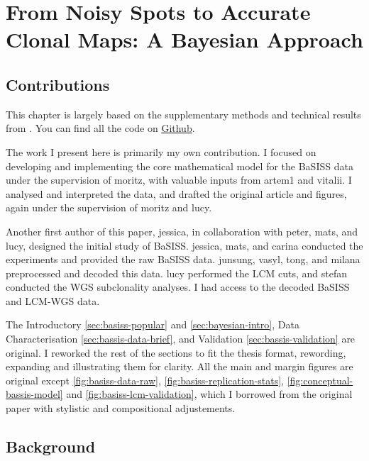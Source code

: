 \chapter{From Noisy Spots to Accurate Clonal Maps: A Bayesian Approach}
\label{sec:chapter-basiss-model}

\section*{Contributions}
This chapter is largely based on the supplementary methods and technical results from . You can find all the code on \href{https://github.com/gerstung-lab/BaSISS}{Github}.

The work I present here is primarily my own contribution. I focused on developing and implementing the core mathematical model for the \acs{BaSISS} data under the supervision of \ac{moritz}, with valuable inputs from \ac{artem1} and \ac{vitalii}. I analysed and interpreted the data, and drafted the original article and figures, again under the supervision of \ac{moritz} and \ac{lucy}.

Another first author of this paper, \ac{jessica}, in collaboration with \ac{peter}, \ac{mats}, and \ac{lucy}, designed the initial study of \acs{BaSISS}. \ac{jessica}, \ac{mats}, and \ac{carina} conducted the experiments and provided the raw \acs{BaSISS} data. \ac{junsung}, \ac{vasyl}, \ac{tong}, and \ac{milana} preprocessed and decoded this data. \ac{lucy} performed the \acs{LCM} cuts, and \ac{stefan} conducted the \acs{WGS} subclonality analyses. I had access to the decoded \acs{BaSISS} and \acs{LCM}-\acs{WGS} data.

The Introductory \cref{sec:basiss-popular} and \cref{sec:bayesian-intro}, Data Characterisation \cref{sec:bassis-data-brief}, and Validation \cref{sec:bassis-validation} are original. I reworked the rest of the sections to fit the thesis format, rewording, expanding and illustrating them for clarity. All the main and margin figures are original except \cref{fig:basiss-data-raw}, \cref{fig:basiss-replication-stats}, \cref{fig:conceptual-bassis-model} and \cref{fig:basiss-lcm-validation}, which I borrowed from the original paper with stylistic and compositional adjustements. 

\section{Background}
